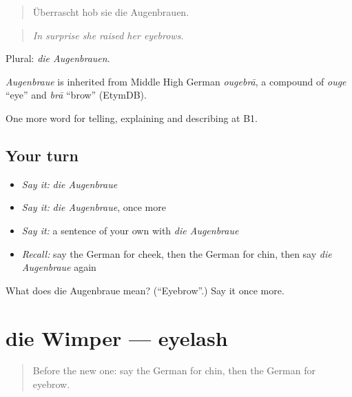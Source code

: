 \begin{quote}
Überrascht hob sie die Augenbrauen.
\end{quote}

\begin{quote}
\emph{In surprise she raised her eyebrows.}
\end{quote}

Plural: \emph{die Augenbrauen}.

\begin{cousinweb}
\emph{Augenbraue} is inherited from Middle High German \emph{ougebrā}, a compound of \emph{ouge} \textquotedblleft{}eye\textquotedblright{} and \emph{brā} \textquotedblleft{}brow\textquotedblright{} (EtymDB).
\end{cousinweb}

\begin{grammarlens}[title={What you've built}]
One more word for telling, explaining and describing at B1.
\end{grammarlens}

\subsection*{Your turn}
\begin{itemize}
\raggedright
  \item \emph{Say it:} \emph{die Augenbraue}
  \item \emph{Say it:} \emph{die Augenbraue}, once more
  \item \emph{Say it:} a sentence of your own with \emph{die Augenbraue}
  \item \emph{Recall:} say the German for cheek, then the German for chin, then say \emph{die Augenbraue} again
\end{itemize}

\begin{tcolorbox}[breakable,colback=teal!4,colframe=teal!35!black,title={Before you move on}]
What does die Augenbraue mean? (\textquotedblleft{}Eyebrow\textquotedblright{}.) Say it once more.
\end{tcolorbox}
\section[die Wimper]{die Wimper — eyelash}

\label{lesson:GE-C484-wimper}



\begin{quote}
Before the new one: say the German for chin, then the German for eyebrow.
\end{quote}

